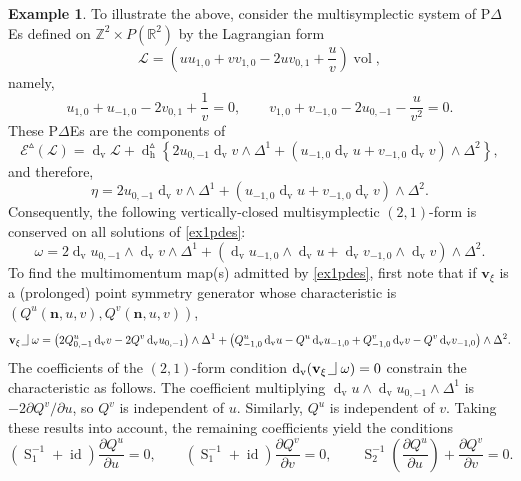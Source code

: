\documentclass[11pt]{article} %
\numberwithin{equation}{section}
\newcommand{\intpsym}{\,\, \setlength{\unitlength}{0.4mm}
	\begin{picture}(0, 0)(5, 5)%
	\put(0, 4){\line(1,0){5}} \put(5,4){\line(0,1){8}}
	\end{picture}\,\,}
\newcommand{\intp}{\,\,\intpsym}
\newcommand{\es}{\operatorname{S}}
\newcommand{\id}{\operatorname{id}}
\newcommand{\volf}{\operatorname{vol}}
\newcommand{\upd}{\operatorname{d}}
\newcommand{\uph}{\operatorname{h}}
\newcommand{\upv}{\operatorname{v}}
\newcommand{\p}{\partial}
\newcommand{\dv}{\upd_{\upv}\!}
\newcommand{\mbn}{\mathbf{n}}
\newcommand{\mbv}{\mathbf{v}}
\newcommand{\mcE}{\mathcal{E}}
\newcommand{\msL}{\mathscr{L}}
\newcommand{\dDh}{\upd^{\vartriangle}_{\uph}}
\theoremstyle{plain}
\theoremstyle{definition}
\newtheorem{exm}[defn]{Example}
\begin{document}
\begin{exm}\label{exm51new}
To illustrate the above, consider the multisymplectic system of P$\Delta$Es defined on $\mathbb{Z}^2\times P(\mathbb{R}^2)$ by the Lagrangian form
\begin{equation}
    \msL=\left(uu_{1,0}+vv_{1,0}-2uv_{0,1}+\frac{u}{v}\right)\volf,
\end{equation}
namely,
\begin{equation}\label{ex1pdes}
    u_{1,0}+u_{-1,0}-2v_{0,1}+\frac{1}{v}=0,\qquad v_{1,0}+v_{-1,0}-2u_{0,-1}-\frac{u}{v^2}=0.
\end{equation}
These P$\Delta$Es are the components of
\begin{equation}
    \mcE^{\vartriangle}(\msL)=\dv \msL+\dDh\!\left\{2u_{0,-1}\dv v\wedge\Delta^1+(u_{-1,0}\dv u+v_{-1,0}\dv v)\wedge\Delta^2\right\},
\end{equation}
and therefore,
\begin{equation}
    \eta=2u_{0,-1}\dv v\wedge\Delta^1+(u_{-1,0}\dv u+v_{-1,0}\dv v)\wedge\Delta^2.
\end{equation}
Consequently, the following vertically-closed multisymplectic $(2,1)$-form is conserved on all solutions of \eqref{ex1pdes}:
\begin{equation}
    \omega=2\dv u_{0,-1}\wedge\dv v\wedge\Delta^1+(\dv u_{-1,0}\wedge\dv u+\dv v_{-1,0}\wedge\dv v)\wedge\Delta^2.
\end{equation}
To find the multimomentum map(s) admitted by \eqref{ex1pdes}, first note that if $\mbv_\xi$ is a (prolonged) point symmetry generator whose characteristic is $(Q^u(\mbn,u,v),Q^v(\mbn,u,v))$, 
\begin{equation}\label{ex1dvlam}   
    \mbv_\xi\intp\omega=\left(2Q^u_{0,-1}\dv v-2Q^v\dv u_{0,-1}\right)\wedge\Delta^1+\left(Q^u_{-1,0}\dv u-Q^u\dv u_{-1,0}+Q^v_{-1,0}\dv v-Q^v\dv v_{-1,0}\right)\wedge\Delta^2.
\end{equation}
The coefficients of the $(2,1)$-form condition $\dv \,(\mbv_\xi\intp\omega)=0$ constrain the characteristic as follows. The coefficient multiplying $\dv u\wedge\dv u_{0,-1}\wedge\Delta^1$ is $-2\partial Q^v/\partial u$, so $Q^v$ is independent of $u$. Similarly, $Q^u$ is independent of $v$. Taking these results into account, the remaining coefficients yield the conditions
\begin{equation}
    \left(\es_1^{-1}+\id\right)\frac{\p Q^u}{\p u}=0,\qquad\left(\es_1^{-1}+\id\right)\frac{\p Q^v}{\p v}=0,\qquad\es_2^{-1}\!\left(\frac{\p Q^u}{\p u}\right)+\frac{\p Q^v}{\p v}=0.
\end{equation}

\end{exm}
\end{document}
